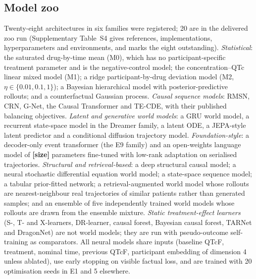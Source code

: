 \documentclass[11pt,a4paper]{article}
\newcommand{\tbd}[1]{{\color{red}\textbf{[#1]}}}
\begin{document}
\subsection{Model zoo}
Twenty-eight architectures in six families were registered; 20 are in the delivered zoo run (Supplementary Table~S4 gives references, implementations, hyperparameters and environments, and marks the eight outstanding). \emph{Statistical}: the saturated drug-by-time mean (M0), which has no participant-specific treatment parameter and is the negative-control model; the concentration--QTc linear mixed model (M1)\cite{garnett2018cqtc}; a ridge participant-by-drug deviation model (M2, $\eta\in\{0.01,0.1,1\}$); a Bayesian hierarchical model with posterior-predictive rollouts; and a counterfactual Gaussian process\cite{schulam2017cgp}. \emph{Causal sequence models}: RMSN, CRN, G-Net, the Causal Transformer and TE-CDE, with their published balancing objectives\cite{lim2018rmsn,bica2020crn,li2021gnet,causaltransformer2022,seedat2022tecde}. \emph{Latent and generative world models}: a GRU world model, a recurrent state-space model in the Dreamer family, a latent ODE, a JEPA-style latent predictor and a conditional diffusion trajectory model\cite{hafner2025dreamer,rubanova2019latentode,clinjepa2026,tashiro2021csdi}. \emph{Foundation-style}: a decoder-only event transformer (the E9 family) and an open-weights language model of \tbd{size} parameters fine-tuned with low-rank adaptation on serialised trajectories\cite{hu2022lora}. \emph{Structural and retrieval-based}: a deep structural causal model\cite{pawlowski2020scm}; a neural stochastic differential equation world model; a state-space sequence model; a tabular prior-fitted network; a retrieval-augmented world model whose rollouts are nearest-neighbour real trajectories of similar patients rather than generated samples; and an ensemble of five independently trained world models whose rollouts are drawn from the ensemble mixture. \emph{Static treatment-effect learners} (S-, T- and X-learners, DR-learner, causal forest, Bayesian causal forest, TARNet and DragonNet)\cite{kunzel2019xlearner,kennedy2023drlearner,wager2018,hahn2020bcf,shalit2017tarnet,shi2019dragonnet} are not world models; they are run with pseudo-outcome self-training as comparators. All neural models share inputs (baseline QTcF, treatment, nominal time, previous QTcF, participant embedding of dimension 4 unless ablated), use early stopping on visible factual loss, and are trained with 20 optimisation seeds in E1 and 5 elsewhere.
\end{document}
